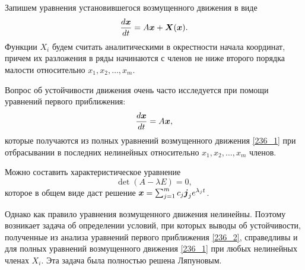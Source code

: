 Запишем уравнения установившегося возмущенного движения в виде
\begin{equation}
	\frac{d \mbox{\boldmath $x$}}{d t} = A \mbox{\boldmath $x$} + \mbox{\boldmath $X$}(\mbox{\boldmath $x$}).
	\label{236_1}
\end{equation}
Функции $X_i$ будем считать аналитическими в окрестности начала координат, причем их разложения в ряды начинаются с членов не ниже второго порядка малости относительно $x_1, x_2, \ldots, x_m$.

Вопрос об устойчивости движения очень часто исследуется при помощи уравнений первого приближения:
\begin{equation}
	\frac{d \mbox{\boldmath $x$}}{d t} = A \mbox{\boldmath $x$},
	\label{236_2}
\end{equation}
которые получаются из полных уравнений возмущенного движения \eqref{236_1} при отбрасывании в последних нелинейных относительно $x_1, x_2, \ldots, x_m$ членов.

Можно составить характеристическое уравнение
\begin{equation}
	\det(A - \lambda E) = 0,
	\label{236_3}
\end{equation}
которое в общем виде даст решение $\mbox{\boldmath $x$} = \sum_{j=1}^m c_j \mbox{\boldmath $j$}_j e^{\lambda_j t}$.


Однако как правило уравнения возмущенного движения нелинейны. Поэтому возникает задача об определении условий, при которых выводы об устойчивости, полученные из анализа уравнений первого приближения \eqref{236_2}, справедливы и для полных уравнений возмущенного движения \eqref{236_1} при любых нелинейных членах $X_i$. Эта задача была полностью решена Ляпуновым.